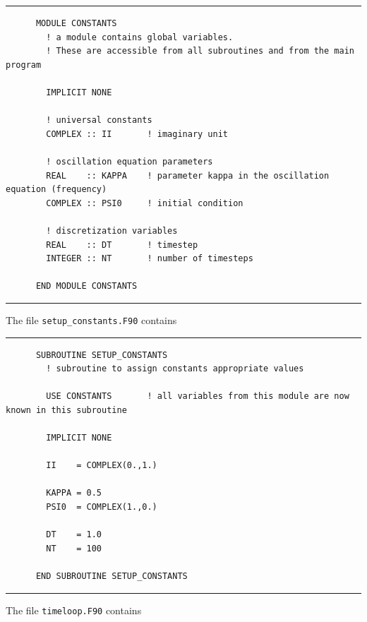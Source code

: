 \documentclass[a4paper]{article}
\begin{document}
{\vspace{10pt}\hrule\small\vspace*{-2pt}\begin{verbatim}
	  MODULE CONSTANTS
	    ! a module contains global variables.
	    ! These are accessible from all subroutines and from the main program

	    IMPLICIT NONE

	    ! universal constants
	    COMPLEX :: II       ! imaginary unit

	    ! oscillation equation parameters
	    REAL    :: KAPPA    ! parameter kappa in the oscillation equation (frequency)
	    COMPLEX :: PSI0     ! initial condition

	    ! discretization variables
	    REAL    :: DT       ! timestep
	    INTEGER :: NT       ! number of timesteps

	  END MODULE CONSTANTS
\end{verbatim}\hrule\vspace{5pt}}
%
\par
The file \verb+setup_constants.F90+ contains
% 
{\vspace{10pt}\hrule\small\vspace*{-2pt}\begin{verbatim}
	  SUBROUTINE SETUP_CONSTANTS
	    ! subroutine to assign constants appropriate values

	    USE CONSTANTS       ! all variables from this module are now known in this subroutine

	    IMPLICIT NONE

	    II    = COMPLEX(0.,1.)

	    KAPPA = 0.5
	    PSI0  = COMPLEX(1.,0.)

	    DT    = 1.0
	    NT    = 100

	  END SUBROUTINE SETUP_CONSTANTS
\end{verbatim}\hrule\vspace{5pt}}
%
\par
The file \verb+timeloop.F90+ contains
% 
\end{document}
